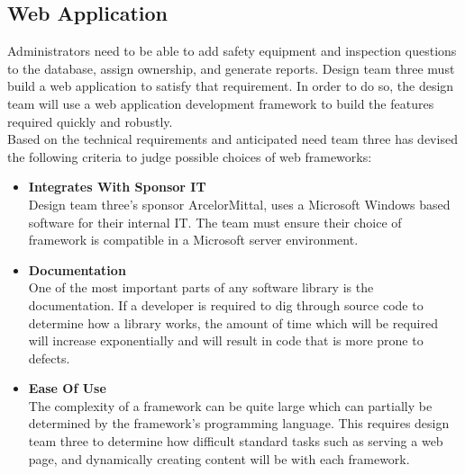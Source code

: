 \documentclass[Letter,11pt]{article}
\begin{document}
	\subsection{Web Application}\label{WEBAPP}
		Administrators need to be able to add safety equipment and inspection questions to the database, assign ownership, and generate reports. Design team three must build a web application to satisfy that requirement. In order to do so, the design team will use a web application development framework to build the features required quickly and robustly.
		\\
		Based on the technical requirements and anticipated need team three has devised the following criteria to judge possible choices of web frameworks:
		\\
		\begin{minipage}[t]{0.5\textwidth}
		\begin{itemize}
			\item \textbf{Integrates With Sponsor IT}\\
			Design team three's sponsor ArcelorMittal, uses a Microsoft Windows based software for their internal IT. The team must ensure their choice of framework is compatible in a Microsoft server environment.

			\item \textbf{Documentation}\\
			One of the most important parts of any software library is the documentation. If a developer is required to dig through source code to determine how a library works, the amount of time which will be required will increase exponentially and will result in code that is more prone to defects.
			\item \textbf{Ease Of Use} \\
			The complexity of a framework can be quite large which can partially be determined by the framework's programming language. This requires design team three to determine how difficult standard tasks such as serving a web page, and dynamically creating content will be with each framework.
		\end{itemize}
		\end{minipage}
\end{document}
